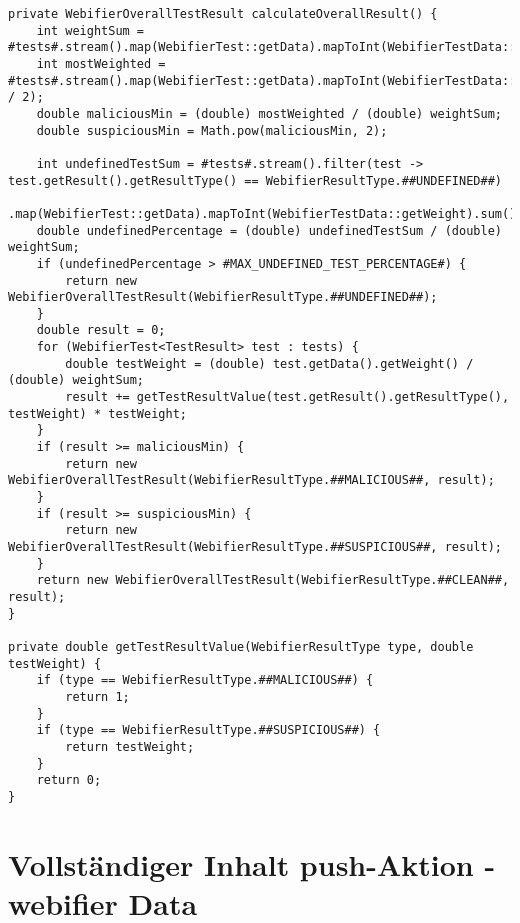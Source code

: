 \begin{scriptsize}
\begin{lstlisting}
private WebifierOverallTestResult calculateOverallResult() {
    int weightSum = #tests#.stream().map(WebifierTest::getData).mapToInt(WebifierTestData::getWeight).sum();
    int mostWeighted = #tests#.stream().map(WebifierTest::getData).mapToInt(WebifierTestData::getWeight).max().orElse(weightSum / 2);
    double maliciousMin = (double) mostWeighted / (double) weightSum;
    double suspiciousMin = Math.pow(maliciousMin, 2);

    int undefinedTestSum = #tests#.stream().filter(test -> test.getResult().getResultType() == WebifierResultType.##UNDEFINED##)
            .map(WebifierTest::getData).mapToInt(WebifierTestData::getWeight).sum();
    double undefinedPercentage = (double) undefinedTestSum / (double) weightSum;
    if (undefinedPercentage > #MAX_UNDEFINED_TEST_PERCENTAGE#) {
        return new WebifierOverallTestResult(WebifierResultType.##UNDEFINED##);
    }
    double result = 0;
    for (WebifierTest<TestResult> test : tests) {
        double testWeight = (double) test.getData().getWeight() / (double) weightSum;
        result += getTestResultValue(test.getResult().getResultType(), testWeight) * testWeight;
    }
    if (result >= maliciousMin) {
        return new WebifierOverallTestResult(WebifierResultType.##MALICIOUS##, result);
    }
    if (result >= suspiciousMin) {
        return new WebifierOverallTestResult(WebifierResultType.##SUSPICIOUS##, result);
    }
    return new WebifierOverallTestResult(WebifierResultType.##CLEAN##, result);
}

private double getTestResultValue(WebifierResultType type, double testWeight) {
    if (type == WebifierResultType.##MALICIOUS##) {
        return 1;
    }
    if (type == WebifierResultType.##SUSPICIOUS##) {
        return testWeight;
    }
    return 0;
}
\end{lstlisting}
\end{scriptsize}

\newpage

\section*{Vollständiger Inhalt push-Aktion - webifier Data}
\label{app:d}

